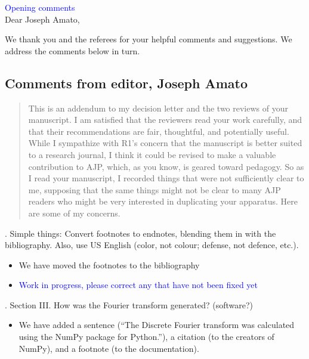 \documentclass{article}
\newcommand{\todo}{\textcolor{blue}}
\begin{document}
\todo{Opening comments}\\


Dear Joseph Amato, 

We thank you and the referees for your helpful comments and suggestions. 
We address the comments below in turn. 

\subsection*{Comments from editor, Joseph Amato}
\begin{quote}
This is an addendum to my decision letter and the two reviews of your manuscript.  I am satisfied that the reviewers read your work carefully, and that their recommendations are fair, thoughtful, and potentially useful.  While I sympathize with R1’s concern that the manuscript is better suited to a research journal, I think it could be revised to make a valuable contribution to AJP, which, as you know, is geared toward pedagogy.  So as I read your manuscript, I recorded things that were not sufficiently clear to me, supposing that the same things might not be clear to many AJP readers who might be very interested in duplicating your apparatus.  Here are some of my concerns.
\end{quote}

. Simple things: Convert footnotes to endnotes, blending them in with the bibliography.  Also, use US English (color, not colour; defense, not defence, etc.). 
\begin{itemize}
\item We have moved the footnotes to the bibliography
\item \todo{Work in progress, please correct any that have not been fixed yet}
\end{itemize}

. Section III.  How was the Fourier transform generated?  (software?)
\begin{itemize}
\item We have added a sentence (``The Discrete Fourier transform was calculated using the NumPy package for Python.''), a citation (to the creators of NumPy), and a footnote (to the documentation).
\end{itemize}
\end{document}
